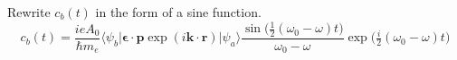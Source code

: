 Rewrite $c_b(t)$ in the form of a sine function.
\begin{equation*}
c_b(t)=\frac{ieA_0}{\hbar m_e}
\langle\psi_b|\boldsymbol{\epsilon}\cdot\mathbf p\exp(i\mathbf k\cdot\mathbf r)|\psi_a\rangle
\frac{\sin\bigl(\tfrac{1}{2}(\omega_0-\omega)t\bigr)}{\omega_0-\omega}
\exp\bigl(\tfrac{i}{2}(\omega_0-\omega)t\bigr)
\tag{2}
\end{equation*}



